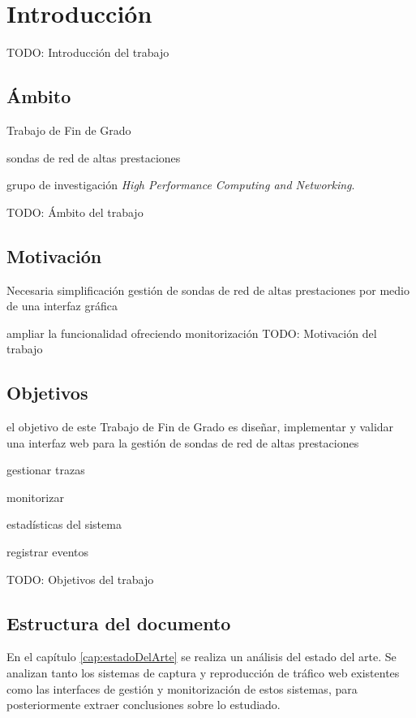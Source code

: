 \chapter{Introducción}

TODO: Introducción del trabajo


\section{\'Ambito}

Trabajo de Fin de Grado

 sondas de red de altas prestaciones

grupo de investigación \textit{High Performance Computing and Networking}. 

TODO: Ámbito del trabajo


\section{Motivación}

Necesaria simplificación gestión de sondas de red de altas prestaciones por medio de una interfaz gráfica

ampliar la funcionalidad ofreciendo monitorización 
TODO: Motivación del trabajo


\section{Objetivos}

el objetivo de este Trabajo de Fin de Grado es diseñar, implementar y validar una interfaz web para la gestión de sondas de red de altas prestaciones 

gestionar \glspl{traza} 

monitorizar

estadísticas del sistema

registrar eventos


TODO: Objetivos del trabajo


\section{Estructura del documento}

En el capítulo \ref{cap:estadoDelArte} se realiza un análisis del estado del arte. Se analizan tanto los sistemas de captura y reproducción de tráfico web existentes como las interfaces de gestión y monitorización de estos sistemas, para posteriormente extraer conclusiones sobre lo estudiado.

